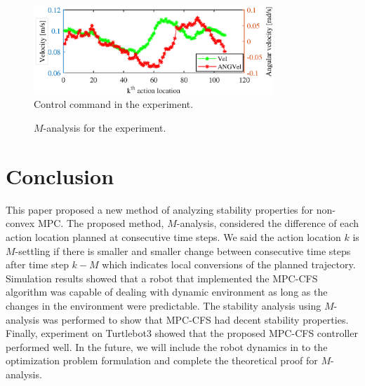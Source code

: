 \documentclass[letterpaper, 10 pt, conference]{ieeeconf}  %
\begin{document}
\begin{figure}[t]
      \centering
      \includegraphics[width=9cm]{plot/video_nice.eps}
      
      \caption{Control command in the experiment. }
      \label{fig:command}
\end{figure}

\begin{figure}[t]
      \centering
       
      \caption{$M$-analysis for the experiment. }
      \label{fig:msettling}
\end{figure}





\section{Conclusion}

This paper proposed a new method of analyzing stability properties for non-convex MPC. The proposed method, $M$-analysis, considered the difference of each action location planned at consecutive time steps. We said the action location $k$ is $M$-settling if there is smaller and smaller change between consecutive time steps after time step $k-M$ which indicates local conversions of the planned trajectory. Simulation results showed that a robot that implemented the MPC-CFS algorithm was capable of dealing with dynamic environment as long as the changes in the environment were predictable. The stability analysis using $M$-analysis was performed to show that MPC-CFS had decent stability properties. Finally, experiment on Turtlebot3 showed that the proposed MPC-CFS controller performed well. In the future, we will include the robot dynamics in to the optimization problem formulation and complete the theoretical proof for $M$-analysis. 





\end{document}
